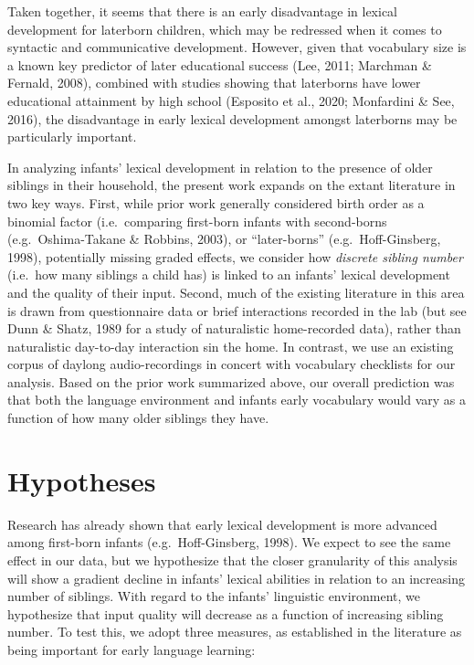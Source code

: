 \documentclass[
  english,
  man,floatsintext]{apa6}
\begin{document}
Taken together, it seems that there is an early disadvantage in lexical development for laterborn children, which may be redressed when it comes to syntactic and communicative development. However, given that vocabulary size is a known key predictor of later educational success (Lee, 2011; Marchman \& Fernald, 2008), combined with studies showing that laterborns have lower educational attainment by high school (Esposito et al., 2020; Monfardini \& See, 2016), the disadvantage in early lexical development amongst laterborns may be particularly important.

In analyzing infants' lexical development in relation to the presence of older siblings in their household, the present work expands on the extant literature in two key ways. First, while prior work generally considered birth order as a binomial factor (i.e.~comparing first-born infants with second-borns (e.g.~Oshima-Takane \& Robbins, 2003), or \enquote{later-borns} (e.g.~Hoff-Ginsberg, 1998), potentially missing graded effects, we consider how \emph{discrete sibling number} (i.e.~how many siblings a child has) is linked to an infants' lexical development and the quality of their input. Second, much of the existing literature in this area is drawn from questionnaire data or brief interactions recorded in the lab (but see Dunn \& Shatz, 1989 for a study of naturalistic home-recorded data), rather than naturalistic day-to-day interaction sin the home. In contrast, we use an existing corpus of daylong audio-recordings in concert with vocabulary checklists for our analysis. Based on the prior work summarized above, our overall prediction was that both the language environment and infants early vocabulary would vary as a function of how many older siblings they have.

\hypertarget{hypotheses}{%
\section{Hypotheses}\label{hypotheses}}

Research has already shown that early lexical development is more advanced among first-born infants (e.g.~Hoff-Ginsberg, 1998). We expect to see the same effect in our data, but we hypothesize that the closer granularity of this analysis will show a gradient decline in infants' lexical abilities in relation to an increasing number of siblings.
With regard to the infants' linguistic environment, we hypothesize that input quality will decrease as a function of increasing sibling number. To test this, we adopt three measures, as established in the literature as being important for early language learning:
\end{document}
